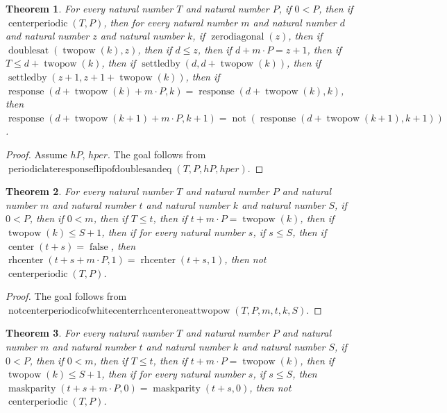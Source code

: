 \documentclass[11pt]{article}
\newtheorem{theorem}{Theorem}[section]
\theoremstyle{definition}
\begin{document}
\begin{theorem}
\label{ll:paper:periodic-late-response-flip-of-doubles-and-eq}
For every natural number \(T\) and natural number \(P\), if \(0 < P\), then if \(\operatorname{centerperiodic}(T, P)\), then for every natural number \(m\) and natural number \(d\) and natural number \(z\) and natural number \(k\), if \(\operatorname{zerodiagonal}(z)\), then if \(\operatorname{doublesat}(\operatorname{twopow}(k), z)\), then if \(d \le z\), then if \(d + m \cdot P = z + 1\), then if \(T \le d + \operatorname{twopow}(k)\), then if \(\operatorname{settledby}(d, d + \operatorname{twopow}(k))\), then if \(\operatorname{settledby}(z + 1, z + 1 + \operatorname{twopow}(k))\), then if \(\operatorname{response}(d + \operatorname{twopow}(k) + m \cdot P, k) = \operatorname{response}(d + \operatorname{twopow}(k), k)\), then \(\operatorname{response}(d + \operatorname{twopow}(k + 1) + m \cdot P, k + 1) = \operatorname{not}(\operatorname{response}(d + \operatorname{twopow}(k + 1), k + 1))\).
\end{theorem}
\begin{proof}
Assume \(hP\), \(hper\).
The goal follows from \(\operatorname{periodiclateresponseflipofdoublesandeq}(T, P, hP, hper)\).
\end{proof}
\begin{theorem}
\label{ll:paper:not-centerperiodic-of-white-center-rhcenter-one-at-twopow}
For every natural number \(T\) and natural number \(P\) and natural number \(m\) and natural number \(t\) and natural number \(k\) and natural number \(S\), if \(0 < P\), then if \(0 < m\), then if \(T \le t\), then if \(t + m \cdot P = \operatorname{twopow}(k)\), then if \(\operatorname{twopow}(k) \le S + 1\), then if for every natural number \(s\), if \(s \le S\), then if \(\operatorname{center}(t + s) = \operatorname{false}\), then \(\operatorname{rhcenter}(t + s + m \cdot P, 1) = \operatorname{rhcenter}(t + s, 1)\), then not \(\operatorname{centerperiodic}(T, P)\).
\end{theorem}
\begin{proof}
The goal follows from \(\operatorname{notcenterperiodicofwhitecenterrhcenteroneattwopow}(T, P, m, t, k, S)\).
\end{proof}
\begin{theorem}
\label{ll:paper:not-centerperiodic-of-maskparity-zero-agree-at-twopow}
For every natural number \(T\) and natural number \(P\) and natural number \(m\) and natural number \(t\) and natural number \(k\) and natural number \(S\), if \(0 < P\), then if \(0 < m\), then if \(T \le t\), then if \(t + m \cdot P = \operatorname{twopow}(k)\), then if \(\operatorname{twopow}(k) \le S + 1\), then if for every natural number \(s\), if \(s \le S\), then \(\operatorname{maskparity}(t + s + m \cdot P, 0) = \operatorname{maskparity}(t + s, 0)\), then not \(\operatorname{centerperiodic}(T, P)\).
\end{theorem}
\end{document}
